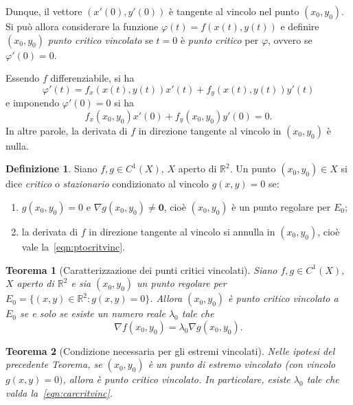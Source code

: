 \documentclass[a4paper]{book}
\numberwithin{equation}{section}
\renewcommand{\phi}{\varphi}
\theoremstyle{plain}
\newtheorem{teor}{Teorema}[section]
\theoremstyle{definition}
\newtheorem{defn}{Definizione}[section]
\theoremstyle{remark}
\renewcommand{\vec}{\boldsymbol}
\theoremstyle{example}
\begin{document}
Dunque, il vettore $(x'(0), y'(0))$ è tangente al vincolo nel punto $(x_0, y_0)$. Si può allora considerare la funzione $\phi(t) = f(x(t), y(t))$ e definire $(x_0, y_0)$ \emph{punto critico vincolato} se $t = 0$ è \emph{punto critico} per $\phi$, ovvero se $\phi'(0) = 0$.

Essendo $f$ differenziabile, si ha
	\begin{equation*}
	\phi'(t) = f_x(x(t), y(t))x'(t) + f_y(x(t), y(t)) y'(t)
	\end{equation*}
e imponendo $\phi'(0) = 0$ si ha
	\begin{equation}
	\label{eqn:ptocritvinc}
	f_x(x_0, y_0)x'(0) + f_y(x_0, y_0)y'(0) = 0.
	\end{equation}
In altre parole, la derivata di $f$ in direzione tangente al vincolo in $(x_0, y_0)$ è nulla.

\begin{defn}
Siano $f, g \in C^1(X)$, $X$ aperto di $\mathbb{R}^2$. Un punto $(x_0, y_0) \in X$ si dice \emph{critico} o \emph{stazionario} condizionato al vincolo $g(x, y) = 0$ se:
	\begin{enumerate}
	\item $g(x_0, y_0) = 0$ e $\nabla g(x_0, y_0) \ne \vec{0}$, cioè $(x_0, y_0)$ è un punto regolare per $E_0$;
	\item la derivata di $f$ in direzione tangente al vincolo si annulla in $(x_0, y_0)$, cioè vale la~\eqref{eqn:ptocritvinc}.
	\end{enumerate}
\end{defn}

\begin{teor}[Caratterizzazione dei punti critici vincolati]
\label{teor:carcritvinc}
Siano $f, g \in C^1(X)$, $X$ aperto di $\mathbb{R}^2$ e sia $(x_0, y_0)$ un punto regolare per $E_0 = \{ (x,y) \in \mathbb{R}^2 \colon g(x,y) = 0\}$. Allora $(x_0, y_0)$ è punto critico vincolato a $E_0$ se e solo se esiste un numero reale $\lambda_0$ tale che
	\begin{equation}
	\label{eqn:carcritvinc}
	\nabla f(x_0, y_0) = \lambda_0 \nabla g(x_0, y_0).
	\end{equation}
\end{teor}

\begin{teor}[Condizione necessaria per gli estremi vincolati]
Nelle ipotesi del precedente Teorema, se $(x_0, y_0)$ è un punto di estremo vincolato (con vincolo $g(x, y) = 0)$, allora è punto critico vincolato. In particolare, esiste $\lambda_0$ tale che valda la~\eqref{eqn:carcritvinc}.
\end{teor}
\end{document}
